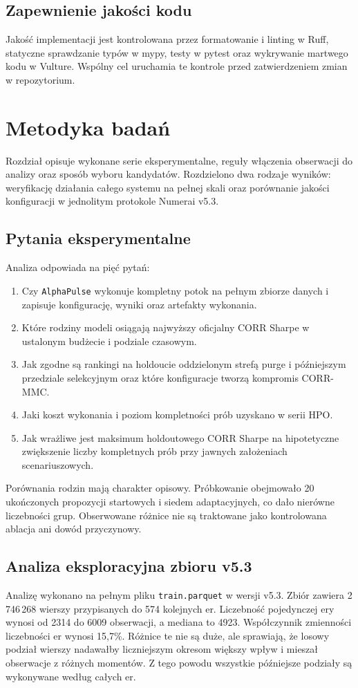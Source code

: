 \documentclass[12pt,a4paper]{report}
\newcommand{\repo}{\texttt{AlphaPulse}}
\newcommand{\datasetver}{v5.3}
\begin{document}
\section{Zapewnienie jakości kodu}
Jakość implementacji jest kontrolowana przez formatowanie i linting w Ruff,
statyczne sprawdzanie typów w mypy, testy w pytest oraz wykrywanie martwego kodu
w Vulture. Wspólny cel  uruchamia te kontrole przed zatwierdzeniem
zmian w repozytorium.

\chapter{Metodyka badań}

Rozdział opisuje wykonane serie eksperymentalne, reguły włączenia obserwacji do
analizy oraz sposób wyboru kandydatów. Rozdzielono dwa rodzaje wyników: weryfikację
działania całego systemu na pełnej skali oraz porównanie jakości konfiguracji
w jednolitym protokole Numerai \datasetver{}.

\section{Pytania eksperymentalne}
Analiza odpowiada na pięć pytań:
\begin{enumerate}\item Czy \repo{} wykonuje kompletny potok na pełnym zbiorze danych i zapisuje
    konfigurację, wyniki oraz artefakty wykonania.
\item Które rodziny modeli osiągają najwyższy oficjalny CORR Sharpe w ustalonym
    budżecie i podziale czasowym.
\item Jak zgodne są rankingi na holdoucie oddzielonym strefą purge i późniejszym
    przedziale selekcyjnym oraz które konfiguracje tworzą kompromis CORR-MMC.
\item Jaki koszt wykonania i poziom kompletności prób uzyskano w serii HPO.
\item Jak wrażliwe jest maksimum holdoutowego CORR Sharpe na hipotetyczne
    zwiększenie liczby kompletnych prób przy jawnych założeniach scenariuszowych.\end{enumerate}

Porównania rodzin mają charakter opisowy. Próbkowanie obejmowało 20 ukończonych
propozycji startowych i siedem adaptacyjnych, co dało nierówne liczebności grup.
Obserwowane różnice nie są traktowane jako kontrolowana ablacja ani dowód przyczynowy.

\section{Analiza eksploracyjna zbioru v5.3}
Analizę wykonano na pełnym pliku \texttt{train.parquet} w wersji v5.3. Zbiór
zawiera 2\,746\,268 wierszy przypisanych do 574 kolejnych er. Liczebność pojedynczej
ery wynosi od 2314 do 6009 obserwacji, a mediana to 4923. Współczynnik zmienności
liczebności er wynosi 15,7\%. Różnice te nie są duże, ale sprawiają, że losowy
podział wierszy nadawałby liczniejszym okresom większy wpływ i mieszał obserwacje
z różnych momentów. Z tego powodu wszystkie późniejsze podziały są wykonywane
według całych er.
\end{document}
